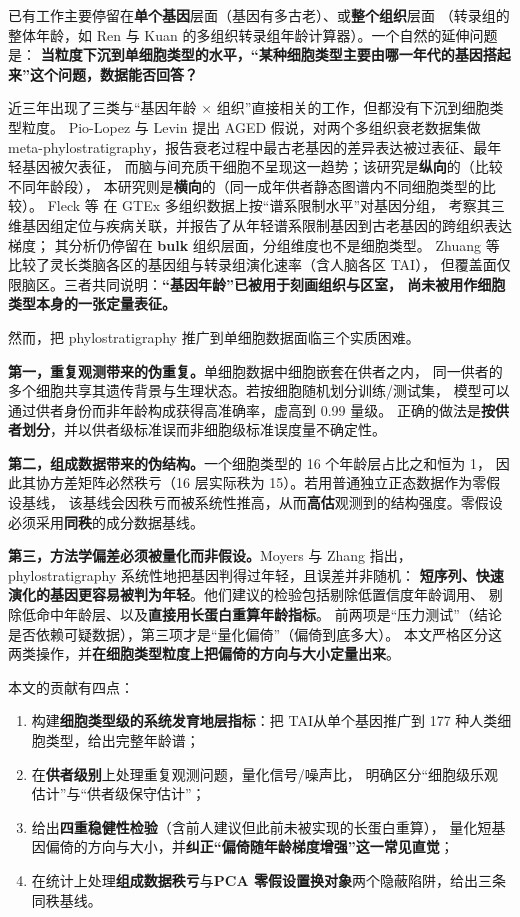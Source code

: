 \documentclass{cjc}
\newcommand{\tai}{\textrm{TAI}}
\begin{document}
已有工作主要停留在\textbf{单个基因}层面（基因有多古老）、或\textbf{整个组织}层面
（转录组的整体年龄，如 Ren 与 Kuan\cite{ren2020} 的多组织转录组年龄计算器）。一个自然的延伸问题是：
\textbf{当粒度下沉到单细胞类型的水平，“某种细胞类型主要由哪一年代的基因搭起来”这个问题，数据能否回答？}

近三年出现了三类与“基因年龄 $\times$ 组织”直接相关的工作，但都没有下沉到细胞类型粒度。
Pio-Lopez 与 Levin\cite{piolopez2025} 提出 AGED 假说，对两个多组织衰老数据集做
meta-phylostratigraphy，报告衰老过程中最古老基因的差异表达被过表征、最年轻基因被欠表征，
而脑与间充质干细胞不呈现这一趋势；该研究是\textbf{纵向}的（比较不同年龄段），
本研究则是\textbf{横向}的（同一成年供者静态图谱内不同细胞类型的比较）。
Fleck 等\cite{fleck2024} 在 GTEx 多组织数据上按“谱系限制水平”对基因分组，
考察其三维基因组定位与疾病关联，并报告了从年轻谱系限制基因到古老基因的跨组织表达梯度；
其分析仍停留在 \textbf{bulk} 组织层面，分组维度也不是细胞类型。
Zhuang 等\cite{zhuang2024} 比较了灵长类脑各区的基因组与转录组演化速率（含人脑各区 TAI），
但覆盖面仅限脑区。三者共同说明：\textbf{“基因年龄”已被用于刻画组织与区室，
尚未被用作细胞类型本身的一张定量表征。}

然而，把 phylostratigraphy 推广到单细胞数据面临三个实质困难。

\textbf{第一，重复观测带来的伪重复。}单细胞数据中细胞嵌套在供者之内，
同一供者的多个细胞共享其遗传背景与生理状态。若按细胞随机划分训练/测试集，
模型可以通过供者身份而非年龄构成获得高准确率，虚高到 0.99 量级。
正确的做法是\textbf{按供者划分}，并以供者级标准误而非细胞级标准误度量不确定性\cite{hafemeister2019}。

\textbf{第二，组成数据带来的伪结构。}一个细胞类型的 16 个年龄层占比之和恒为 1，
因此其协方差矩阵必然秩亏（16 层实际秩为 15）。若用普通独立正态数据作为零假设基线，
该基线会因秩亏而被系统性推高，从而\textbf{高估}观测到的结构强度。零假设必须采用\textbf{同秩}的成分数据基线。

\textbf{第三，方法学偏差必须被量化而非假设。}Moyers 与 Zhang\cite{moyers2015,moyers2017,moyers2018}
指出，phylostratigraphy 系统性地把基因判得过年轻，且误差并非随机：
\textbf{短序列、快速演化的基因更容易被判为年轻}。他们建议的检验包括剔除低置信度年龄调用、
剔除低命中年龄层、以及\textbf{直接用长蛋白重算年龄指标}。
前两项是“压力测试”（结论是否依赖可疑数据），第三项才是“量化偏倚”（偏倚到底多大）。
本文严格区分这两类操作，并\textbf{在细胞类型粒度上把偏倚的方向与大小定量出来}。

本文的贡献有四点：
\begin{enumerate}[label=(\arabic*)]
  \item 构建\textbf{细胞类型级的系统发育地层指标}：把 \tai 从单个基因推广到 177 种人类细胞类型，给出完整年龄谱；
  \item 在\textbf{供者级别}上处理重复观测问题，量化信号/噪声比，
        明确区分“细胞级乐观估计”与“供者级保守估计”；
  \item 给出\textbf{四重稳健性检验}（含前人建议但此前未被实现的长蛋白重算），
        量化短基因偏倚的方向与大小，并\textbf{纠正“偏倚随年龄梯度增强”这一常见直觉}；
  \item 在统计上处理\textbf{组成数据秩亏}与\textbf{PCA 零假设置换对象}两个隐蔽陷阱，给出三条同秩基线。
\end{enumerate}
\end{document}
